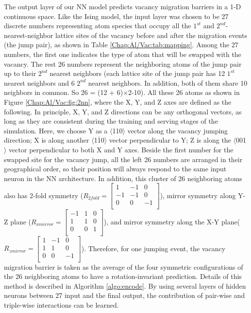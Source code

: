 The output layer of our \ac{NN} model predicts vacancy migration barriers in a 1-D continuous space. Like the Ising model, the input layer was chosen to be 27 discrete numbers representing atom species that occupy all the $\text{1}^{st}$ and $\text{2}^{nd}$-nearest-neighbor lattice sites of the vacancy before and after the migration events (the jump pair), as shown in Table \ref{Chap:Al/Vac:tab:mapping}. Among the 27 numbers, the first one indicates the type of atom that will be swapped with the vacancy. The rest 26 numbers represent the neighboring atoms of the jump pair up to their $\text{2}^{nd}$ nearest neighbors (each lattice site of the jump pair has 12  $\text{1}^{st}$ nearest neighbors and 6 $\text{2}^{nd}$ nearest neighbors. In addition, both of them share 10 neighbors in common. So 26 = (12 + 6)$\times$2-10). All these 26 atoms as shown in Figure \ref{Chap:Al/Vac:fig:2nn}, where the X, Y, and Z axes are defined as the following. In principle, X, Y, and Z directions can be any orthogonal vectors, as long as they are consistent during the training and serving stages of the simulation. Here, we choose Y as a $\langle$110$\rangle$ vector along the vacancy jumping direction; X is along another $\langle$1$\bar{1}$0$\rangle$ vector perpendicular to Y; Z is along the $\langle$001$\rangle$ vector perpendicular to both X and Y axes. Beside the first number for the swapped site for the vacancy jump, all the left 26 numbers are arranged in their geographical order, so their position will always respond to the same input neuron in the \ac{NN} architecture. In addition, this cluster of 26 neighboring atoms also has 2-fold symmetry  ($R_{2 fold} = \begin{bmatrix} 1 & -1 & 0 \\-1 & -1 & 0 \\0 & 0 & -1 \\\end{bmatrix}$), mirror symmetry along Y-Z plane ($R_{x mirror} = \begin{bmatrix} -1 & 1 & 0 \\1 & 1 & 0 \\0 & 0 & 1 \\\end{bmatrix}$), and mirror symmetry along the X-Y plane($R_{z mirror} = \begin{bmatrix} 1 & -1 & 0 \\1 & 1 & 0 \\0 & 0 & -1 \\\end{bmatrix}$). Therefore, for one jumping event, the vacancy migration barrier is taken as the average of the four symmetric configurations of the 26 neighboring atoms to have a rotation-invariant prediction. Details of this method is described in Algorithm \ref{algo:encode}. By using several layers of hidden neurons between 27 input and the final output, the contribution of pair-wise and triple-wise interactions can be learned.

